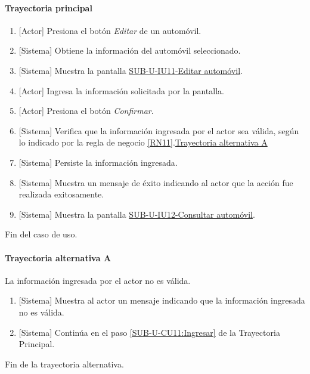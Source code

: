 \paragraph{Trayectoria principal}
	\begin{enumerate}
		\item {[Actor]} Presiona el botón \textit{Editar} de un automóvil.
		\item {[Sistema]} Obtiene la información del automóvil seleccionado.
		\item {[Sistema]} Muestra la pantalla \hyperref[fig:sub-u-iu11]{SUB-U-IU11-Editar automóvil}.
		\item \label{SUB-U-CU11:Ingresar} {[Actor]} Ingresa la información solicitada por la pantalla.
		\item {[Actor]} Presiona el botón \textit{Confirmar}.
		\item {[Sistema]} Verifica que la información ingresada por el actor sea válida, según lo indicado por la regla de negocio \ref{RN11}.\hyperref[SUB-U-CU11:TA]{Trayectoria alternativa A}
		\item {[Sistema]} Persiste la información ingresada.
		\item {[Sistema]} Muestra un mensaje de éxito indicando al actor que la acción fue realizada exitosamente.
		\item \label{SUB-U-CU11:Pantalla} {[Sistema]} Muestra la pantalla \hyperref[fig:sub-u-iu12]{SUB-U-IU12-Consultar automóvil}.
	\end{enumerate}
	Fin del caso de uso.

\paragraph{Trayectoria alternativa A} \label{SUB-U-CU11:TA}
	La información ingresada por el actor no es válida.
	\begin{enumerate}[label=A\arabic*.]
		\item {[Sistema]} Muestra al actor un mensaje indicando que la información ingresada no es válida.
		\item {[Sistema]} Continúa en el paso \ref{SUB-U-CU11:Ingresar} de la Trayectoria Principal.
	\end{enumerate}
	Fin de la trayectoria alternativa.

